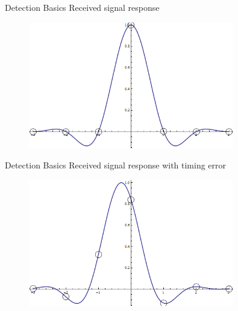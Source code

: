 \documentclass[xcolor=x11names,compress]{beamer}
\renewcommand{\(}{\begin{columns}}
\renewcommand{\)}{\end{columns}}
\newcommand{\<}[1]{\begin{column}{#1}}
\renewcommand{\>}{\end{column}}
\begin{document}
\begin{frame}{Detection Basics}
Received signal response
\begin{figure}[h!]
  \centering
    \includegraphics[width=0.8\textwidth]{../../plots/seminar_rrc_sync.png}
\end{figure}
\end{frame}

\begin{frame}{Detection Basics}
Received signal response with timing error
\begin{figure}[h!]
  \centering
    \includegraphics[width=0.8\textwidth]{../../plots/seminar_rrc_error.png}
\end{figure}
\end{frame}
\end{document}
